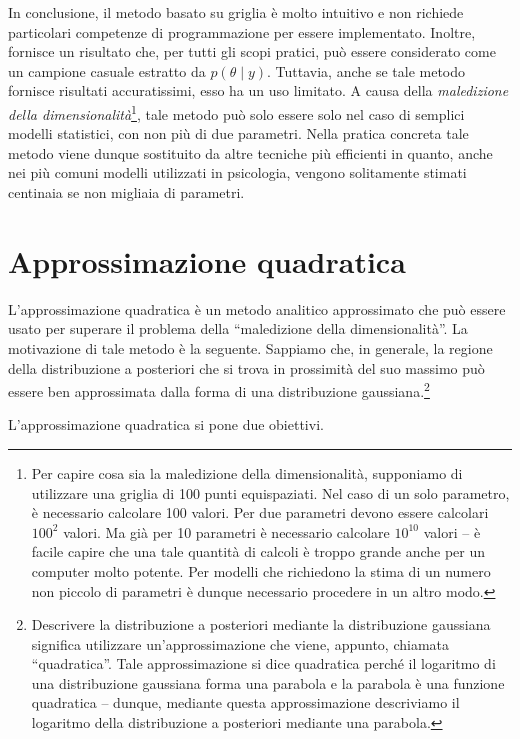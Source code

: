 \documentclass[
  11pt,
]{krantz}
\theoremstyle{definition}
\theoremstyle{definition}
\theoremstyle{definition}
\theoremstyle{definition}
\theoremstyle{remark}
\begin{document}
In conclusione, il metodo basato su griglia è molto intuitivo e non richiede particolari competenze di programmazione per essere implementato. Inoltre, fornisce un risultato che, per tutti gli scopi pratici, può essere considerato come un campione casuale estratto da \(p(\theta \mid y)\). Tuttavia, anche se tale metodo fornisce risultati accuratissimi, esso ha un uso limitato. A causa della \emph{maledizione della dimensionalità}\footnote{Per capire cosa sia la maledizione della dimensionalità, supponiamo di utilizzare una griglia di 100 punti equispaziati. Nel caso di un solo parametro, è necessario calcolare 100 valori. Per due parametri devono essere calcolari \(100^2\) valori. Ma già per 10 parametri è necessario calcolare \(10^{10}\) valori -- è facile capire che una tale quantità di calcoli è troppo grande anche per un computer molto potente. Per modelli che richiedono la stima di un numero non piccolo di parametri è dunque necessario procedere in un altro modo.}, tale metodo può solo essere solo nel caso di semplici modelli statistici, con non più di due parametri. Nella pratica concreta tale metodo viene dunque sostituito da altre tecniche più efficienti in quanto, anche nei più comuni modelli utilizzati in psicologia, vengono solitamente stimati centinaia se non migliaia di parametri.

\hypertarget{approssimazione-quadratica}{%
\section{Approssimazione quadratica}\label{approssimazione-quadratica}}

L'approssimazione quadratica è un metodo analitico approssimato che può essere usato per superare il problema della ``maledizione della dimensionalità''. La motivazione di tale metodo è la seguente. Sappiamo che, in generale, la regione della distribuzione a posteriori che si trova in prossimità del suo massimo può essere ben approssimata dalla forma di una distribuzione gaussiana.\footnote{Descrivere la distribuzione a posteriori mediante la distribuzione gaussiana significa utilizzare un'approssimazione che viene, appunto, chiamata ``quadratica''. Tale approssimazione si dice quadratica perché il logaritmo di una distribuzione gaussiana forma una parabola e la parabola è una funzione quadratica -- dunque, mediante questa approssimazione descriviamo il logaritmo della distribuzione a posteriori mediante una parabola.}

L'approssimazione quadratica si pone due obiettivi.
\end{document}
